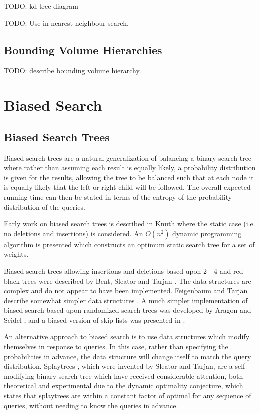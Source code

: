 \documentclass[mcs]{scsthesis}
\begin{document}
TODO: kd-tree diagram

TODO: Use in nearest-neighbour search.

\subsection{Bounding Volume Hierarchies}

TODO: describe bounding volume hierarchy.

\section{Biased Search}

\subsection{Biased Search Trees}

Biased search trees are a natural generalization of balancing a binary search
tree where rather than assuming each result is equally likely, a probability
distribution is given for the results, allowing the tree to be balanced such
that at each node it is equally likely that the left or right child will be
followed.  The overall expected running time can then be stated in terms of the
entropy of the probability distribution of the queries.

Early work on biased search trees is described in Knuth \cite{knuth} where
the static case (i.e. no deletions and insertions) is considered.  An \(O(n^2)\)
dynamic programming algorithm is presented which constructs an optimum static
search tree for a set of weights.

Biased search trees allowing insertions and deletions based upon 2 - 4 and
red-black trees were described by Bent, Sleator and Tarjan \cite{bst}.  The
data structures are complex and do not appear to have been implemented.
Feigenbaum and Tarjan describe somewhat simpler data structures \cite{bst2}. A
much simpler implementation of biased search based upon randomized search trees
was developed by Aragon and Seidel \cite{treap}, and a biased version of skip
lists \cite{skiplist} was presented in \cite{bsl2}.

An alternative approach to biased search is to use data structures which
modify themselves in response to queries.  In this case, rather than specifying
the probabilities in advance, the data structure will change itself to match
the query distribution.  Splaytrees \cite{splaytree}, which were invented by
Sleator and Tarjan, are a self-modifying binary search tree which have
received considerable attention, both theoretical and experimental due to the
dynamic optimality conjecture, which states that splaytrees are within a
constant factor of optimal for any sequence of queries, without needing to
know the queries in advance.
\end{document}
